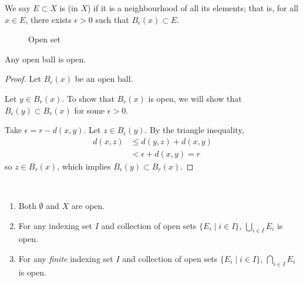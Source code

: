 \begin{definition}
We say $E\subset X$ is  (in $X$) if it is a neighbourhood of all its elements; that is, for all $x\in E$, there exists $\epsilon>0$ such that $B_\epsilon(x)\subset E$.
\end{definition}

\begin{figure}[H]
\centering
{}
\caption{Open set}
\end{figure}

\begin{lemma}
Any open ball is open.
\end{lemma}

\begin{figure}[H]
\centering
{}
\end{figure}

\begin{proof}
Let $B_r(x)$ be an open ball. 

Let $y\in B_r(x)$. To show that $B_r(x)$ is open, we will show that $B_\epsilon(y)\subset B_r(x)$ for some $\epsilon>0$.

Take $\epsilon=r-d(x,y)$. 
Let $z\in B_\epsilon(y)$. By the triangle inequality,
\begin{align*}
d(x,z)&\le d(y,z)+d(x,y)\\
&<\epsilon+d(x,y)=r
\end{align*}
so $z\in B_r(x)$, which implies $B_\epsilon(y)\subset B_r(x)$.
\end{proof}

\begin{lemma}\label{lemma:open-set-properties} \
\begin{enumerate}[label=(\roman*)]
\item Both $\emptyset$ and $X$ are open.
\item For any indexing set $I$ and collection of open sets $\{E_i\mid i\in I\}$, $\bigcup_{i\in I}E_i$ is open.
\item For any \emph{finite} indexing set $I$ and collection of open sets $\{E_i\mid i\in I\}$, $\bigcap_{i\in I}E_i$ is open.
\end{enumerate}
\end{lemma}

